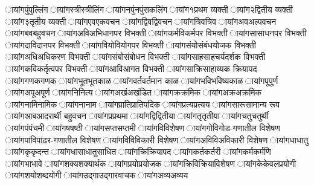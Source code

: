 \छायांग{पुं}{पुल्लिंग}%
\छायांग{स्त्री}{स्त्रीलिंग}%
\छायांग{नपुं}{नपुंसकलिंग}%
\छायांग{१}{प्रथम व्यक्ती}%
\छायांग{२}{द्वितीय व्यक्ती}%
\छायांग{३}{तृतीय व्यक्ती}%
\छायांग{एव}{एकवचन}%
\छायांग{द्विव}{द्विवचन}%
\छायांग{त्रिव}{त्रिव}%
\छायांग{अव}{अल्पवचन}%
\छायांग{बव}{बहुवचन}%
\छायांग{अवि}{अभिधानपर विभक्ती}%
\छायांग{कर्मवि}{कर्मपर विभक्ती}%
\छायांग{सा}{साधनपर विभक्ती}%
\छायांग{दावि}{दानपर विभक्ती}%
\छायांग{वियो}{वियोगपर विभक्ती}%
\छायांग{संयो}{संबंधयोजक विभक्ती}%
\छायांग{अधि}{अधिकरण विभक्ती}%
\छायांग{संबो}{संबोधन विभक्ती}%
\छायांग{साह}{साहचर्यदर्शक विभक्ती}%
\छायांग{कवि}{कर्तृत्वपर विभक्ती}%
\छायांग{आवि}{आगत विभक्ती}%
\छायांग{साक्रि}{साहाय्यक क्रियापद}%
\छायांग{गणक}{गणक}%
\छायांग{भूत}{भूतकाळ}%
\छायांग{वर्त}{वर्तमान काळ}%
\छायांग{भवि}{भविष्यकाळ}%
\छायांग{पू}{पूर्ण}%
\छायांग{अपू}{अपूर्ण}%
\छायांग{नि}{नित्य}%
\छायांग{अखं}{अखंडित}%
\छायांग{क्र}{क्रमिक}%
\छायांग{अक्र}{अक्रमिक}%
% 
% 
\छायांग{नामि}{नामिक}
\छायांग{ना}{नाम}
\छायांग{प्राति}{प्रातिपदिक}
\छायांग{प्रत्य}{प्रत्यय}
\छायांग{सारू}{सामान्य रूप}%
\छायांग{आब}{आदरार्थी बहुवचन}
\छायांग{प्र}{प्रथमा}
\छायांग{द्वि}{द्वितीया}
\छायांग{तृ}{तृतीया}
\छायांग{चतु}{चतुर्थी}
\छायांग{पं}{पंचमी}
\छायांग{ष}{षष्ठी}
\छायांग{सप्त}{सप्तमी}
% 
\छायांग{वि}{विशेषण}
\छायांग{गोवि}{गोड-गणातील विशेषण}
\छायांग{पांवि}{पांढर-गणातील विशेषण}
\छायांग{विवि}{विकारी विशेषण}
\छायांग{अविवि}{अविकारी विशेषण}
% 
% 
\छायांग{धा}{धातु}
\छायांग{कृ}{कृदन्त}
\छायांग{धासा}{धातुसाधित}
\छायांग{क्रि}{क्रियापद}
\छायांग{कर्त}{कर्तरी}
\छायांग{कर्म}{कर्मणि}
\छायांग{भा}{भावे}
\छायांग{शक्य}{शक्यार्थक}
\छायांग{प्रयो}{प्रयोजक}
% 
\छायांग{क्रिवि}{क्रियाविशेषण}
\छायांग{के}{केवलप्रयोगी}
\छायांग{शयो}{शब्दयोगी}
\छायांग{उद्गा}{उद्गारवाचक}
\छायांग{अव्य}{अव्यय}